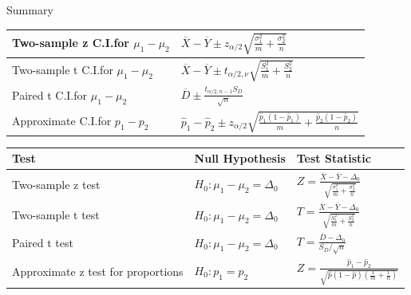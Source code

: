 \documentclass[handout]{beamer}
\begin{document}
\begin{frame}{Summary}

\vspace{-.6cm}
\renewcommand*{\arraystretch}{1.4}
\begin{center}
\begin{tabular}{|p{5cm}|l|}
\hline
Two-sample z C.I.\@ for $\mu_1-\mu_2$  & $\overline{X} - \overline{Y} \pm z_{\alpha/2}\sqrt{\frac{\sigma_1^2}m+\frac{\sigma_2^2}n}$ \\ \hline
Two-sample t C.I.\@ for $\mu_1-\mu_2$ & $\overline{X} - \overline{Y} \pm t_{\alpha/2,\nu}\sqrt{\frac{S_1^2}m+\frac{S_2^2}n}$ \\ \hline
Paired t C.I.\@ for $\mu_1-\mu_2$ & 
$\displaystyle\overline D \pm \frac{t_{\alpha/2,n-1}S_D}{\sqrt{n}}$ \\ \hline
Approximate C.I.\@ for $p_1-p_2$ & $\hat p_1-\hat p_2 \pm z_{\alpha/2}\sqrt{\frac{\hat p_1(1-\hat p_1)}m+\frac{\hat p_2(1-\hat p_2)}n}$ \\ \hline
\end{tabular}
\end{center}

\vspace{-.3cm}
\begin{center}
\begin{tabular}{|p{1.2in}|l|l|} \hline
Test & Null Hypothesis & Test Statistic  \\ \hline
Two-sample z test & $H_0: \mu_1-\mu_2=\Delta_0$ &$Z=\frac{\overline X-\overline Y-\Delta_0}{\sqrt{\frac{\sigma_1^2}m+\frac{\sigma_2^2}n}}$  \\ \hline
Two-sample t test & $H_0: \mu_1-\mu_2=\Delta_0$ & $T=\frac{\overline X-\overline Y-\Delta_0}{\sqrt{\frac{S_1^2}m+\frac{S_2^2}n}}$  \\ \hline
Paired t test & $H_0: \mu_1-\mu_2=\Delta_0$ & $T=\frac{\overline D-\Delta_0}{S_D/\sqrt n}$  \\ \hline
Approximate z test for proportions & $H_0: p_1=p_2$ & $Z=\frac{\hat p_1-\hat p_2}{\sqrt{\hat p(1-\hat p)\left(\frac1m+\frac1n\right)}}$  \\ \hline
\end{tabular}
\end{center}

\end{frame}
\end{document}
